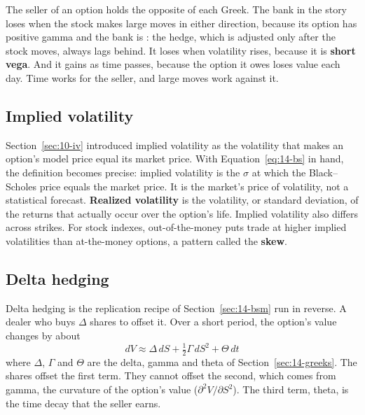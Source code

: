 The seller of an option holds the opposite of each Greek. The bank in the story loses when the stock makes large moves in either direction, because its option has positive gamma and the bank is : the hedge, which is adjusted only after the stock moves, always lags behind. It loses when volatility rises, because it is \textbf{short vega}. And it gains as time passes, because the option it owes loses value each day. Time works for the seller, and large moves work against it.

\subsection{Implied volatility}
\label{sec:14-iv}

Section~\ref{sec:10-iv} introduced implied volatility as the volatility that makes an option's model price equal its market price. With Equation~\eqref{eq:14-bs} in hand, the definition becomes precise: implied volatility is the $\sigma$ at which the Black--Scholes price equals the market price. It is the market's price of volatility, not a statistical forecast. \textbf{Realized volatility} is the volatility, or standard deviation, of the returns that actually occur over the option's life. Implied volatility also differs across strikes. For stock indexes, out-of-the-money puts trade at higher implied volatilities than at-the-money options, a pattern called the \textbf{skew}.

\subsection{Delta hedging}

Delta hedging is the replication recipe of Section~\ref{sec:14-bsm} run in reverse. A dealer who  buys $\Delta$ shares to offset it. Over a short period, the option's value changes by about
\begin{equation}
  dV \approx \Delta\,dS + \tfrac{1}{2}\Gamma\,dS^2 + \Theta\,dt
  \label{eq:14-taylor}
\end{equation}
where $\Delta$, $\Gamma$ and $\Theta$ are the delta, gamma and theta of Section~\ref{sec:14-greeks}. The shares offset the first term. They cannot offset the second, which comes from gamma, the curvature of the option's value ($\partial^2 V/\partial S^2$). The third term, theta, is the time decay that the seller earns.

